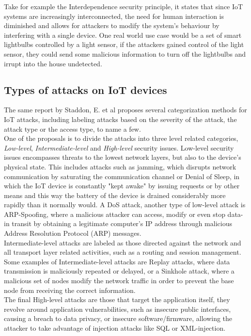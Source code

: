 Take for example the Interdependence security principle, it states that since IoT systems are increasingly interconnected, the need for human interaction is diminished and allows for attackers to modify the system's behaviour by interfering with a single device. One real world use case would be a set of smart lightbulbs controlled by a light sensor, if the attackers gained control of the light sensor, they could send some malicious information to turn off the lightbulbs and irrupt into the house undetected.


\subsection{Types of attacks on IoT devices}
The same report by Staddon, E. et al \cite{IoT_categorization} proposes several categorization methods for IoT attacks, including labeling attacks based on the severity of the attack, the attack type or the access type, to name a few.\\

One of the proposals is to divide the attacks into three level related categories, \emph{Low-level}, \emph{Intermediate-level} and \emph{High-level} security issues. Low-level security issues encompasses threats to the lowest network layers, but also to the device's physical state. This includes attacks such as jamming, which disrupts network communication by saturating the communication channel or Denial of Sleep, in which the IoT device is constantly "kept awake" by issuing requests or by other means and this way the battery of the device is drained considerably more rapidly than it normally would. A DoS attack, another type of low-level attack is ARP-Spoofing, where a malicious attacker can access, modify or even stop data-in transit by obtaining a legitimate computer's IP address through malicious Address Resolution Protocol (ARP) messages.\\

Intermediate-level attacks are labeled as those directed against the network and all transport layer related activities, such as a routing and session management. Some examples of Intermediate-level attacks are Replay attacks, where data transmission is maliciously repeated or delayed, or a Sinkhole attack, where a malicious set of nodes modify the network traffic in order to prevent the base node from receiving the correct information.\\

The final High-level attacks are those that target the application itself, they revolve around application vulnerabilities, such as insecure public interfaces, causing a breach to data privacy, or insecure software/firmware, allowing the attacker to take advantage of injection attacks like SQL or XML-injection.\\


